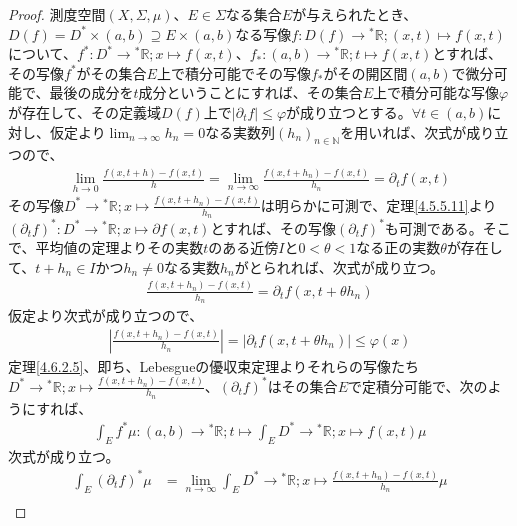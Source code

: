 \documentclass[dvipdfmx]{jsarticle}
\begin{document}
\begin{proof}
測度空間$(X,\varSigma,\mu)$、$E \in \varSigma$なる集合$E$が与えられたとき、$D(f) = D^{*} \times (a,b) \supseteq E \times (a,b)$なる写像$f:D(f) \rightarrow{}^{*}\mathbb{R};(x,t) \mapsto f(x,t)$について、$f^{*}:D^{*} \rightarrow{}^{*}\mathbb{R};x \mapsto f(x,t)$、$f_{*}:(a,b) \rightarrow{}^{*}\mathbb{R};t \mapsto f(x,t)$とすれば、その写像$f^{*}$がその集合$E$上で積分可能でその写像$f_{*}$がその開区間$(a,b)$で微分可能で、最後の成分を$t$成分ということにすれば、その集合$E$上で積分可能な写像$\varphi$が存在して、その定義域$D(f)$上で$\left| \partial_{t}f \right| \leq \varphi$が成り立つとする。$\forall t \in (a,b)$に対し、仮定より$\lim_{n \rightarrow \infty}h_{n} = 0$なる実数列$\left( h_{n} \right)_{n \in \mathbb{N}}$を用いれば、次式が成り立つので、
\begin{align*}
\lim_{h \rightarrow 0}\frac{f(x,t + h) - f(x,t)}{h} = \lim_{n \rightarrow \infty}\frac{f\left( x,t + h_{n} \right) - f(x,t)}{h_{n}} = \partial_{t}f(x,t)
\end{align*}
その写像$D^{*} \rightarrow{}^{*}\mathbb{R};x \mapsto \frac{f\left( x,t + h_{n} \right) - f(x,t)}{h_{n}}$は明らかに可測で、定理\ref{4.5.5.11}より$\left( \partial_{t}f \right)^{*}:D^{*} \rightarrow{}^{*}\mathbb{R};x \mapsto \partial f(x,t)$とすれば、その写像$\left( \partial_{t}f \right)^{*}$も可測である。そこで、平均値の定理よりその実数$t$のある近傍$I$と$0 < \theta < 1$なる正の実数$\theta$が存在して、$t + h_{n} \in I$かつ$h_{n} \neq 0$なる実数$h_{n}$がとられれば、次式が成り立つ。
\begin{align*}
\frac{f\left( x,t + h_{n} \right) - f(x,t)}{h_{n}} = \partial_{t}f\left( x,t + \theta h_{n} \right)
\end{align*}
仮定より次式が成り立つので、
\begin{align*}
\left| \frac{f\left( x,t + h_{n} \right) - f(x,t)}{h_{n}} \right| = \left| \partial_{t}f\left( x,t + \theta h_{n} \right) \right| \leq \varphi(x)
\end{align*}
定理\ref{4.6.2.5}、即ち、Lebesgueの優収束定理よりそれらの写像たち$D^{*} \rightarrow{}^{*}\mathbb{R};x \mapsto \frac{f\left( x,t + h_{n} \right) - f(x,t)}{h_{n}}$、$\left( \partial_{t}f \right)^{*}$はその集合$E$で定積分可能で、次のようにすれば、
\begin{align*}
\int_{E} {f^{*}\mu}:(a,b) \rightarrow{}^{*}\mathbb{R};t \mapsto \int_{E} {D^{*} \rightarrow{}^{*}\mathbb{R};x \mapsto f(x,t)\mu}
\end{align*}
次式が成り立つ。
\begin{align*}
\int_{E} {\left( \partial_{t}f \right)^{*}\mu} &= \lim_{n \rightarrow \infty}{\int_{E} {D^{*} \rightarrow{}^{*}\mathbb{R};x \mapsto \frac{f\left( x,t + h_{n} \right) - f(x,t)}{h_{n}}\mu}}\\

\end{align*}
\end{proof}
\end{document}
